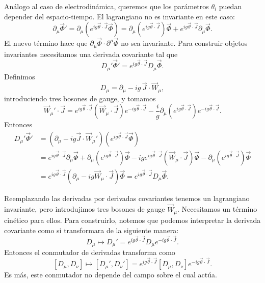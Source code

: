 \documentclass[11pt,a4paper]{article}
\newcommand{\concept}[1]{\textcolor{concept-green}{#1}}
\begin{document}
Análogo al caso de electrodinámica, queremos que los parámetros $\theta_i$
puedan depender del espacio-tiempo. El lagrangiano no es invariante en este
caso:
\[
  \partial_\mu\vec\Phi'
  =\partial_\mu\left(e^{ig\vec\theta\cdot\vec J}\vec\Phi\right)
  =\partial_\mu\left(e^{ig\vec\theta\cdot\vec J}\right)\vec\Phi
   +e^{ig\vec\theta\cdot\vec J}\partial_\mu\vec\Phi.
\]
El nuevo término hace que
$\partial_\mu\vec\Phi\cdot\partial^\mu\vec\Phi$ no sea invariante. Para
construir objetos invariantes necesitamos una \concept{derivada covariante}
tal que
\[
  D_\mu'\vec\Phi'
  =e^{ig\vec\theta\cdot\vec J}D_\mu\vec\Phi.
\]
Definimos
\[
  D_\mu=\partial_\mu-ig\,\vec J\cdot\vec W_\mu,
\]
introduciendo tres bosones de gauge, y tomamos
\[
  \vec W_\mu'\cdot\vec J
  =e^{ig\vec\theta\cdot\vec J}
     (\vec W_\mu\cdot\vec J)
     e^{-ig\vec\theta\cdot\vec J}
  -\frac{i}{g}
   \partial_\mu\left(e^{ig\vec\theta\cdot\vec J}\right)
   e^{-ig\vec\theta\cdot\vec J}.
\]
Entonces
\begin{align*}
  D_\mu'\vec\Phi'
  &=(\partial_\mu-ig\vec J\cdot\vec W_\mu')
    \left(e^{ig\vec\theta\cdot\vec J}\vec\Phi\right)\\
  &=e^{ig\vec\theta\cdot\vec J}\partial_\mu\vec\Phi
    +\partial_\mu\left(e^{ig\vec\theta\cdot\vec J}\right)\vec\Phi
    -ig e^{ig\vec\theta\cdot\vec J}
       (\vec W_\mu\cdot\vec J)\vec\Phi
    -\partial_\mu\left(e^{ig\vec\theta\cdot\vec J}\right)\vec\Phi\\
  &=e^{ig\vec\theta\cdot\vec J}
    \left(\partial_\mu-ig\vec W_\mu\cdot\vec J\right)\vec\Phi
   =e^{ig\vec\theta\cdot\vec J}D_\mu\vec\Phi.
\end{align*}

Reemplazando las derivadas por derivadas covariantes tenemos un lagrangiano
invariante, pero introdujimos tres bosones de gauge $\vec W_\mu$. Necesitamos
un término cinético para ellos. Para construirlo, notemos que podemos
interpretar la derivada covariante como si transformara de la siguiente manera:
\[
  D_\mu\longmapsto D_\mu'
  =e^{ig\vec\theta\cdot\vec J}D_\mu e^{-ig\vec\theta\cdot\vec J}.
\]
Entonces el conmutador de derivadas transforma como
\[
  [D_\mu,D_\nu]\longmapsto[D_\mu',D_\nu']
  =e^{ig\vec\theta\cdot\vec J}
    [D_\mu,D_\nu]
    e^{-ig\vec\theta\cdot\vec J}.
\]
Es más, este conmutador no depende del campo sobre el cual actúa.
\end{document}
